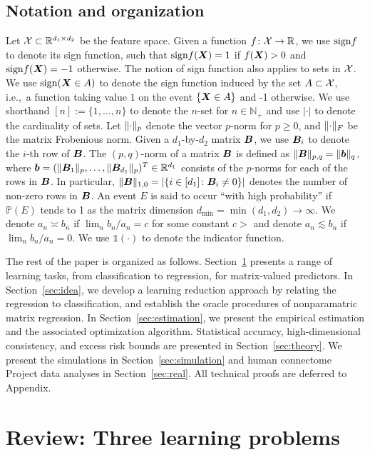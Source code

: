 \documentclass[11pt]{article}
\theoremstyle{plain}
\theoremstyle{definition}
\def\sign{\textup{sign}}
\begin{document}
 
 
\subsection{Notation and organization} 
Let $\mathcal{X}\subset \mathbb{R}^{d_1\times d_2}$ be the feature space. Given a function $f\colon \mathcal{X} \to \mathbb{R}$, we use $\sign f$ to denote its sign function, such that $\sign f(\mX)=1$ if $f(\bm X)>0$ and $\sign f(\mX)=-1$ otherwise. The notion of sign function also applies to sets in $\mathcal{X}$. We use $\sign (\mX\in A)$ to denote the sign function induced by the set $A\subset\mathcal{X}$, i.e.,\ a function taking value $1$ on the event $\{\bm X\in A\}$ and -1 otherwise. We use shorthand $[n]:=\{1,\ldots,n\}$ to denote the $n$-set for $n\in\mathbb{N}_{+}$ and use $|\cdot|$ to denote the cardinality of sets. Let $\lVert\cdot\rVert_p$ denote the vector $p$-norm for $p\geq 0$, and $\lVert\cdot\rVert_F$ be the matrix Frobenious norm. Given a $d_1$-by-$d_2$ matrix $\bm B$, we use $\bm B_i$ to denote the $i$-th row of $\bm B$. The $(p,q)$-norm of a matrix $\bm B$ is defined as $\lVert\bm B\rVert_{p,q}=\lVert\bm{b}\rVert_q$, where $\bm{b}=(\lVert\bm B_1\rVert_p,\ldots,\lVert\bm B_{d_1}\rVert_p)^T\in\mathbb{R}^{d_1}$ consists of the $p$-norms for each of the rows in $\bm B$. In particular, $\lVert\bm B\rVert_{1,0}=|\{i\in [d_1]\colon \bm B_i\neq 0\}|$ denotes the number of non-zero rows in $\bm B$. An event $E$ is said to occur ``with high probability'' if $\mathbb{P}(E)$ tends to 1 as the matrix dimension $d_{\min}=\min(d_1,d_2)\to\infty$. We denote $a_n\asymp b_n$ if $\lim_n b_n/a_n= c$ for some constant $c>$ and denote $a_n\lesssim b_n$ if $\lim_n b_n/a_n=0.$ We use $\mathds{1}(\cdot)$ to denote the indicator function. 

The rest of the paper is organized as follows. Section~\ref{sec:problem} presents a range of learning tasks, from classification to regression, for matrix-valued predictors. In Section~\ref{sec:idea}, we develop a learning reduction approach by relating the regression to classification, and establish the oracle procedures of nonparamatric matrix regression. In Section~\ref{sec:estimation}, we present the empirical estimation and the associated optimization algorithm. Statistical accuracy, high-dimensional consistency, and excess risk bounds are presented in Section~\ref{sec:theory}. We present the simulations in Section~\ref{sec:simulation} and human connectome Project data analyses in Section~\ref{sec:real}. All technical proofs are deferred to Appendix. 

\section{Review: Three learning problems}\label{sec:problem}
\end{document}

